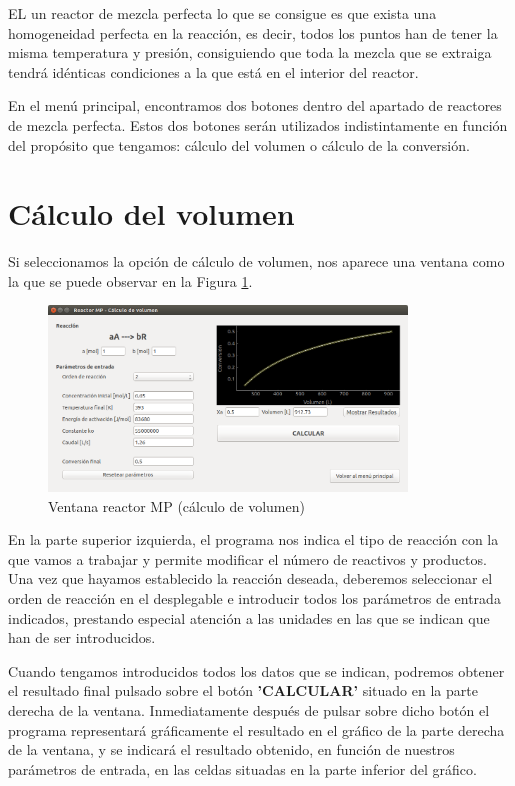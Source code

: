 EL un reactor de mezcla perfecta lo  que  se  consigue  es  que  exista  una  homogeneidad 
perfecta en la reacción, es decir, todos los puntos han de tener la misma temperatura y presión, 
consiguiendo que toda la mezcla que se extraiga tendrá idénticas condiciones a la que 
está en el interior del reactor.
	
	En el menú principal, encontramos dos botones dentro del apartado de reactores de mezcla perfecta. Estos dos botones serán utilizados indistintamente en función del propósito que tengamos: cálculo del volumen o cálculo de la conversión.
	
\section{Cálculo del volumen}
Si seleccionamos la opción de cálculo de volumen, nos aparece una ventana como la que se puede observar en la Figura \ref{fig:ventana_volumen}.

\begin{figure}[h!]
	\begin{center}
		\includegraphics[width=0.85\textwidth]{./imagenes/reactor_fp/mezcla_perfecta1.png}\caption{Ventana reactor MP (cálculo de volumen)}\label{fig:ventana_volumen}
	\end{center}
\end{figure}

En la parte superior izquierda, el programa nos indica el tipo de reacción con la que vamos a trabajar y permite modificar el número de reactivos y productos. Una vez que hayamos establecido la reacción deseada, deberemos seleccionar el orden de reacción en el desplegable e introducir todos los parámetros de entrada indicados, prestando especial atención a las unidades en las que se indican que han de ser introducidos.

Cuando tengamos introducidos todos los datos que se indican, podremos obtener el resultado final pulsado sobre el botón \textbf{'CALCULAR'} situado en la parte derecha de la ventana. Inmediatamente después de pulsar sobre dicho botón el programa representará gráficamente el resultado en el gráfico de la parte derecha de la ventana, y se indicará el resultado obtenido, en función de nuestros parámetros de entrada, en las celdas situadas en la parte inferior del gráfico.

